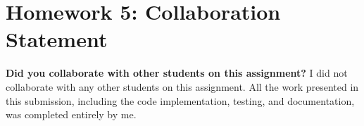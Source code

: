 \documentclass[11pt]{article}
\begin{document}
\section*{Homework 5: Collaboration Statement}

\textbf{Did you collaborate with other students on this assignment?} I did not collaborate with any other students on this assignment. All the work presented in this submission, including the code implementation, testing, and documentation, was completed entirely by me.
\end{document}
